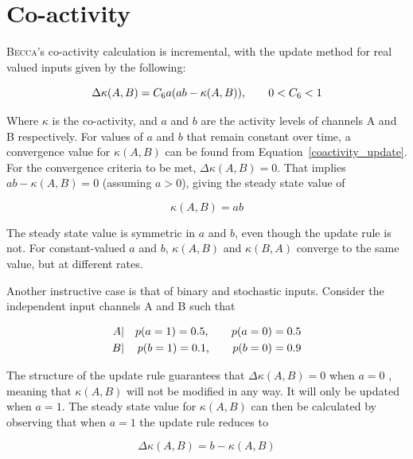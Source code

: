 \section{Co-activity}
\label{coactivity_calc}
\textsc{Becca}'s co-activity calculation is incremental, with the update method for real valued inputs given by the following:

\begin{equation}
\Delta\kappa(A, B) = C_6 a ( a b - \kappa(A, B) ) \mbox{,  \hspace{0.2in}  } 0 < C_6 < 1		
\label{coactivity_update}
\end{equation}

Where $\kappa$ is the co-activity, and $a$ and $b$ are the activity levels of channels A and B respectively. For values of $a$ and $b$ that remain constant over time, a convergence value for $\kappa(A, B)$ can be found from Equation~\ref{coactivity_update}. For the convergence criteria to be met, $\Delta\kappa(A, B) = 0$. That implies $a b - \kappa(A, B) = 0$ (assuming $a > 0$), giving the steady state value of

\begin{equation}
\kappa(A, B) = a b 
\end{equation}

The steady state value is symmetric in $a$ and $b$, even though the update rule is not. For constant-valued $a$ and $b$, $\kappa(A, B)$ and $\kappa(B, A)$ converge to the same value, but at different rates. 

Another instructive case is that of binary and stochastic inputs. Consider the independent input channels A and B such that

\begin{eqnarray}
A &|& p(a = 1) = 0.5 \mbox{, \hspace{0.2in}  } p(a = 0) = 0.5\\
B &|& p(b = 1) = 0.1 \mbox{, \hspace{0.2in}  } p(b = 0) = 0.9 	
\end{eqnarray}

The structure of the update rule guarantees that $\Delta\kappa(A, B) = 0$ when $a = 0$ , meaning that $\kappa(A, B)$ will not be modified in any way. It will only be updated when $a = 1$. The steady state value for $\kappa(A, B)$ can then be calculated by observing that when $a = 1$ the update rule reduces to 

\begin{equation}
\Delta \kappa(A, B) = b - \kappa(A, B)  
\end{equation}

